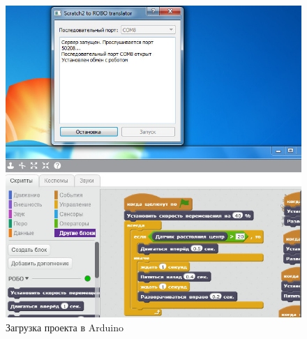 \begin{figure}[H]\center
  \captionsetup{singlelinecheck=true} %
  \includegraphics*[scale=0.7]{about/images/scratch2_addon_setup_4}
  \caption{Загрузка проекта в Arduino} \label{p:scratch2_addon_setup_4}
\end{figure}



















